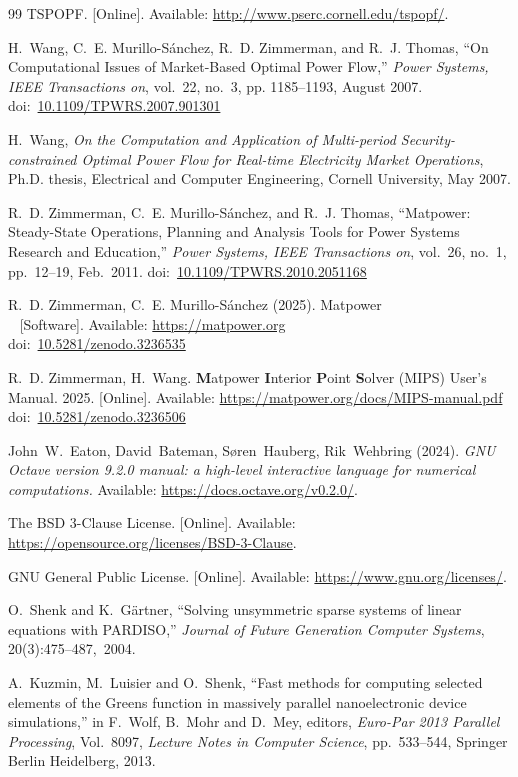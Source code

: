 \documentclass[12pt]{article}
\newcommand{\matpower}[0]{{\sc Matpower}}
\newcommand{\mips}[0]{{MIPS}}
\newcommand{\mipsname}[0]{{{\bf M}{\sc atpower} \textbf{I}nterior \textbf{P}oint \textbf{S}olver}}
\newcommand{\doi}[1]{doi:~\href{https://doi.org/#1}{#1}}
\numberwithin{equation}{section}
\numberwithin{table}{section}
\numberwithin{figure}{section}
\begin{document}
\clearpage
\begin{thebibliography}{99}
TSPOPF. [Online]. Available: \url{http://www.pserc.cornell.edu/tspopf/}.

H.~Wang, C.~E. Murillo-S{\'a}nchez, R.~D. Zimmerman, and R.~J. Thomas, ``On
Computational Issues of Market-Based Optimal Power Flow,'' \emph{Power
Systems, IEEE Transactions on}, vol.~22, no.~3, pp. 1185--1193, August 2007.
\doi{10.1109/TPWRS.2007.901301}

H.~Wang, \emph{On the Computation and Application of Multi-period Security-constrained Optimal Power Flow for Real-time Electricity Market Operations}, Ph.D. thesis, Electrical and Computer Engineering, Cornell University, May 2007.

R.~D. Zimmerman, C.~E. Murillo-S{\'a}nchez, and R.~J. Thomas, ``\matpower{}: Steady-State Operations, Planning and Analysis Tools for Power Systems Research and Education,'' \emph{Power Systems, IEEE Transactions on}, vol.~26, no.~1, pp.~12--19, Feb.~2011.
\doi{10.1109/TPWRS.2010.2051168}

R.~D. Zimmerman, C.~E. Murillo-S{\'a}nchez (2025). \matpower{}\\~
[Software]. Available: \url{https://matpower.org}\\
\doi{10.5281/zenodo.3236535}

R.~D. Zimmerman, H.~Wang. \mipsname{} (\mips{}) User's Manual. 2025.
[Online]. Available: \url{https://matpower.org/docs/MIPS-manual.pdf}\\
\doi{10.5281/zenodo.3236506}

John~W.~Eaton, David~Bateman, S{\o}ren~Hauberg, Rik~Wehbring (2024). \emph{GNU Octave version 9.2.0 manual: a high-level interactive language for numerical computations.} Available: \url{https://docs.octave.org/v0.2.0/}.

The BSD 3-Clause License. [Online]. Available: \url{https://opensource.org/licenses/BSD-3-Clause}.

GNU General Public License. [Online]. Available: \url{https://www.gnu.org/licenses/}.

O.~Shenk and K.~G\"artner, ``Solving unsymmetric sparse systems of linear equations with PARDISO,'' \emph{Journal of Future Generation Computer Systems}, 20(3):475--487,~2004.

A.~Kuzmin, M.~Luisier and O.~Shenk, ``Fast methods for computing selected elements of the Greens function in massively parallel nanoelectronic device simulations,'' in F.~Wolf, B.~Mohr and D.~Mey, editors, \emph{Euro-Par 2013 Parallel Processing}, Vol.~8097, \emph{Lecture Notes in Computer Science}, pp.~533--544, Springer Berlin Heidelberg, 2013.

\end{thebibliography}
\end{document}
